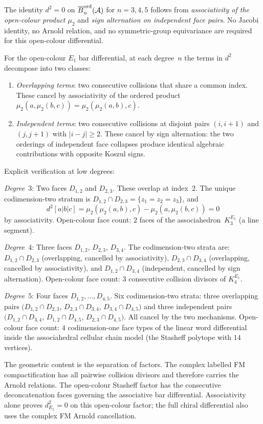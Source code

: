 \begin{proposition}[Open-colour ordered AOS relations: $d^2=0$ from
associativity alone; \ClaimStatusProvedHere]
\label{prop:ordered-aos}
The identity $d^2=0$ on
$\overline{B}^{\mathrm{ord}}_n(\mathcal{A})$ for $n=3,4,5$ follows from
\emph{associativity of the open-colour product \(\mu_2\)} and
\emph{sign alternation on independent face pairs}. No Jacobi
identity, no Arnold relation, and no symmetric-group
equivariance are required for this open-colour differential.

For the open-colour $E_1$ bar differential, at each degree~$n$ the
terms in $d^2$ decompose into two
classes:
\begin{enumerate}[label=\textup{(\roman*)}]
\item \emph{Overlapping terms}: two consecutive collisions
 that share a common index. These cancel by associativity
 of the ordered product
 \(\mu_2(a,\mu_2(b,c))=\mu_2(\mu_2(a,b),c)\).
\item \emph{Independent terms}: two consecutive collisions
 at disjoint pairs $(i,i{+}1)$ and $(j,j{+}1)$ with
 $|i-j|\ge 2$. These cancel by sign alternation:
 the two orderings of independent face collapses produce
 identical algebraic contributions with opposite Koszul
 signs.
\end{enumerate}

Explicit verification at low degrees:

\emph{Degree~$3$}: Two faces $D_{1,2}$ and $D_{2,3}$.
These overlap at index~$2$. The unique codimension-two
stratum is $D_{1,2}\cap D_{2,3}=\{z_1{=}z_2{=}z_3\}$,
and
\[
d^2[a|b|c]=\mu_2(\mu_2(a,b),c)
-\mu_2(a,\mu_2(b,c))=0
\]
by associativity.
Open-colour face count: $2$ faces of the associahedron~$K_3^{E_1}$
(a line segment).

\emph{Degree~$4$}: Three faces $D_{1,2}$, $D_{2,3}$,
$D_{3,4}$. The codimension-two strata are:
$D_{1,2}\cap D_{2,3}$ (overlapping, cancelled by
associativity), $D_{2,3}\cap D_{3,4}$ (overlapping,
cancelled by associativity), and $D_{1,2}\cap D_{3,4}$
(independent, cancelled by sign alternation).
Open-colour face count: $3$ consecutive collision divisors of
$K_4^{E_1}$.

\emph{Degree~$5$}: Four faces $D_{1,2},\ldots,D_{4,5}$.
Six codimension-two strata: three overlapping pairs
$(D_{1,2}\cap D_{2,3}$, $D_{2,3}\cap D_{3,4}$,
$D_{3,4}\cap D_{4,5})$ and three independent pairs
$(D_{1,2}\cap D_{3,4}$, $D_{1,2}\cap D_{4,5}$,
$D_{2,3}\cap D_{4,5})$. All cancel by the two mechanisms.
Open-colour face count: $4$ codimension-one face types of the
linear word differential inside the associahedral cellular chain model
(the Stasheff polytope with $14$ vertices).

The geometric content is the separation of factors. The complex
labelled FM compactification has all pairwise collision divisors and
therefore carries the Arnold relations. The open-colour Stasheff factor
has the consecutive deconcatenation faces governing the associative
bar differential. Associativity alone proves $d_{E_1}^2=0$ on this
open-colour factor; the full chiral differential also uses the complex
FM Arnold cancellation.
\end{proposition}

